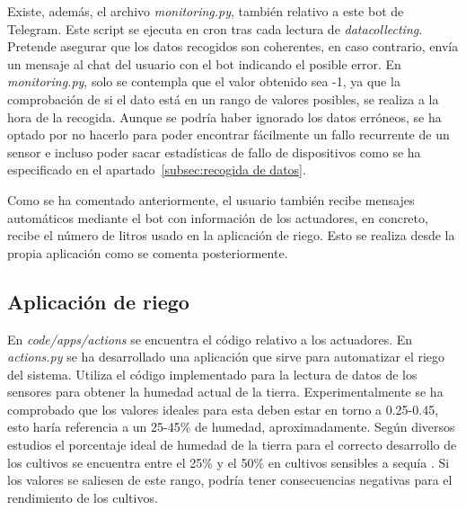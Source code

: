\documentclass[a4paper, 12pt, oneside]{book}
\begin{document}
Existe, además, el archivo \textit{monitoring.py}, también relativo a este bot de Telegram. Este script se ejecuta en cron tras cada lectura de \textit{datacollecting}. Pretende asegurar que los datos recogidos son coherentes, en caso contrario, envía un mensaje al chat del usuario con el bot indicando el posible error. En \textit{monitoring.py}, solo se contempla que el valor obtenido sea -1, ya que la comprobación de si el dato está en un rango de valores posibles, se realiza a la hora de la recogida. Aunque se podría haber ignorado los datos erróneos, se ha optado por no hacerlo para poder encontrar fácilmente un fallo recurrente de un sensor e incluso poder sacar estadísticas de fallo de dispositivos como se ha especificado en el apartado~\ref{subsec:recogida de datos}.

Como se ha comentado anteriormente, el usuario también recibe mensajes automáticos mediante el bot con información de los actuadores, en concreto, recibe el número de litros usado en la aplicación de riego. Esto se realiza desde la propia aplicación como se comenta posteriormente.




\subsection{Aplicación de riego}
\label{subsec:riego}
En \textit{code/apps/actions} se encuentra el código relativo a los actuadores. En \textit{actions.py} se ha desarrollado una aplicación que sirve para automatizar el riego del sistema. Utiliza el código implementado para la lectura de datos de los sensores para obtener la humedad actual de la tierra. Experimentalmente se ha comprobado que los valores ideales para esta deben estar en torno a 0.25-0.45, esto haría referencia a un 25-45\% de humedad, aproximadamente. Según diversos estudios el porcentaje ideal de humedad de la tierra para el correcto desarrollo de los cultivos se encuentra entre el 25\% y el 50\% en cultivos sensibles a sequía \cite{porcentaje_riego} \cite{humedad_suelo}. Si los valores se saliesen de este rango, podría tener consecuencias negativas para el rendimiento de los cultivos. 
\end{document}
